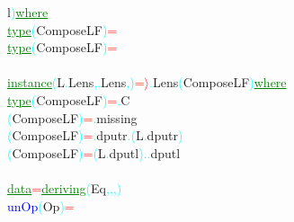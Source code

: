 {\rm{}l}\textcolor{cyan}{)}\hsspace \textcolor{green}{\underline{where}}\\\hstab \textcolor{green}{\underline{type}}\hsspace \textcolor{cyan}{(}{\rm{}ComposeLF}\textcolor{cyan}{)}\hsspace \textcolor{red}{=}\\\hstab \textcolor{green}{\underline{type}}\hsspace \textcolor{cyan}{(}{\rm{}ComposeLF}\textcolor{cyan}{)}\hsspace \textcolor{red}{=}\\\\\textcolor{green}{\underline{instance}}\hsspace \textcolor{cyan}{(}{\rm{}L}\textcolor{cyan}{.}{\rm{}Lens}\textcolor{cyan}{,}\textcolor{cyan}{.}{\rm{}Lens}\textcolor{cyan}{,}\hsspace \textcolor{red}{\tilde{ }}\textcolor{cyan}{)}\hsspace \textcolor{red}{=\ensuremath{\rangle}}\textcolor{cyan}{.}{\rm{}Lens}\hsspace \textcolor{cyan}{(}{\rm{}ComposeLF}\textcolor{cyan}{)}\hsspace \textcolor{green}{\underline{where}}\\\hstab \textcolor{green}{\underline{type}}\hsspace \textcolor{cyan}{(}{\rm{}ComposeLF}\textcolor{cyan}{)}\hsspace \textcolor{red}{=}\textcolor{cyan}{.}{\rm{}C}\\\hsspace \hsspace \textcolor{cyan}{(}{\rm{}ComposeLF}\textcolor{cyan}{)}\hsspace \textcolor{red}{=}\textcolor{cyan}{.}{\rm{}missing}\\\hsspace \textcolor{cyan}{(}{\rm{}ComposeLF}\textcolor{cyan}{)}\hsspace \textcolor{red}{=}\textcolor{cyan}{.}{\rm{}dputr}\hsspace \textcolor{cyan}{.}\hsspace \textcolor{cyan}{(}{\rm{}L}\textcolor{cyan}{.}{\rm{}dputr}\textcolor{cyan}{)}\\\hsspace \textcolor{cyan}{(}{\rm{}ComposeLF}\textcolor{cyan}{)}\hsspace \textcolor{red}{=}\hsspace \textcolor{cyan}{(}{\rm{}L}\textcolor{cyan}{.}{\rm{}dputl}\textcolor{cyan}{)}\hsspace \textcolor{cyan}{.}\textcolor{cyan}{.}{\rm{}dputl}\\\\\textcolor{green}{\underline{data}}\hsspace \textcolor{red}{=}\hsspace \textcolor{green}{\underline{deriving}}\hsspace \textcolor{cyan}{(}{\rm{}Eq}\textcolor{cyan}{,}\textcolor{cyan}{,}\textcolor{cyan}{,}\textcolor{cyan}{)}\\\textcolor{blue}{unOp}\hsspace \textcolor{cyan}{(}{\rm{}Op}\textcolor{cyan}{)}\hsspace \textcolor{red}{=}\hsspace 